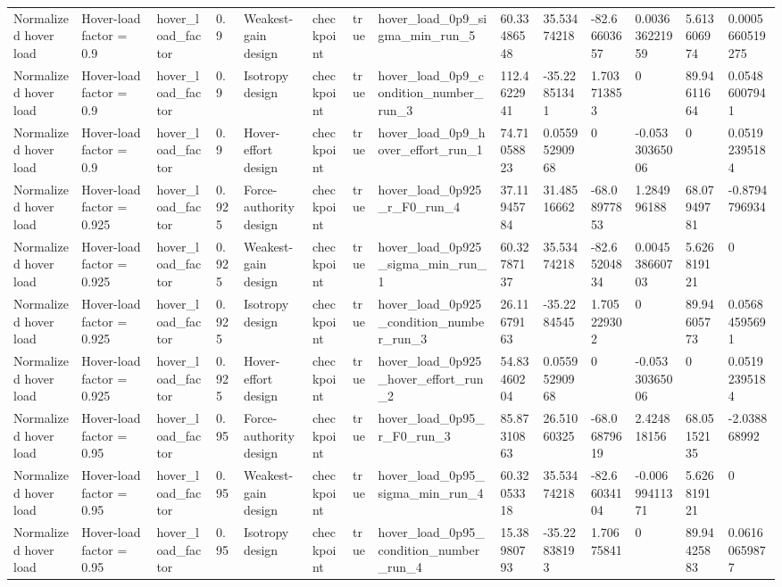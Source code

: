 \begin{tabular}{@{}llllllllllllll@{}}
Normalized hover load & Hover-load factor = 0.9 & hover\_load\_factor & 0.9 & Weakest-gain design & checkpoint & true & hover\_load\_0p9\_sigma\_min\_run\_5 & 60.33486548 & 35.53474218 & -82.66603657 & 0.003636221959 & 5.613606974 & 0.0005660519275 \\
Normalized hover load & Hover-load factor = 0.9 & hover\_load\_factor & 0.9 & Isotropy design & checkpoint & true & hover\_load\_0p9\_condition\_number\_run\_3 & 112.4622941 & -35.22851341 & 1.703713853 & 0 & 89.94611664 & 0.05486007941 \\
Normalized hover load & Hover-load factor = 0.9 & hover\_load\_factor & 0.9 & Hover-effort design & checkpoint & true & hover\_load\_0p9\_hover\_effort\_run\_1 & 74.71058823 & 0.05595290968 & 0 & -0.05330365006 & 0 & 0.05192395184 \\
Normalized hover load & Hover-load factor = 0.925 & hover\_load\_factor & 0.925 & Force-authority design & checkpoint & true & hover\_load\_0p925\_r\_F0\_run\_4 & 37.11945784 & 31.48516662 & -68.08977853 & 1.284996188 & 68.07949781 & -0.8794796934 \\
Normalized hover load & Hover-load factor = 0.925 & hover\_load\_factor & 0.925 & Weakest-gain design & checkpoint & true & hover\_load\_0p925\_sigma\_min\_run\_1 & 60.32787137 & 35.53474218 & -82.65204834 & 0.004538660703 & 5.626819121 & 0 \\
Normalized hover load & Hover-load factor = 0.925 & hover\_load\_factor & 0.925 & Isotropy design & checkpoint & true & hover\_load\_0p925\_condition\_number\_run\_3 & 26.11679163 & -35.2284545 & 1.705229302 & 0 & 89.94605773 & 0.05684595691 \\
Normalized hover load & Hover-load factor = 0.925 & hover\_load\_factor & 0.925 & Hover-effort design & checkpoint & true & hover\_load\_0p925\_hover\_effort\_run\_2 & 54.83460204 & 0.05595290968 & 0 & -0.05330365006 & 0 & 0.05192395184 \\
Normalized hover load & Hover-load factor = 0.95 & hover\_load\_factor & 0.95 & Force-authority design & checkpoint & true & hover\_load\_0p95\_r\_F0\_run\_3 & 85.87310863 & 26.51060325 & -68.06879619 & 2.424818156 & 68.05152135 & -2.038868992 \\
Normalized hover load & Hover-load factor = 0.95 & hover\_load\_factor & 0.95 & Weakest-gain design & checkpoint & true & hover\_load\_0p95\_sigma\_min\_run\_4 & 60.32053318 & 35.53474218 & -82.66034104 & -0.00699411371 & 5.626819121 & 0 \\
Normalized hover load & Hover-load factor = 0.95 & hover\_load\_factor & 0.95 & Isotropy design & checkpoint & true & hover\_load\_0p95\_condition\_number\_run\_4 & 15.38980793 & -35.22838193 & 1.70675841 & 0 & 89.94425883 & 0.06160659877 \\

\end{tabular}
